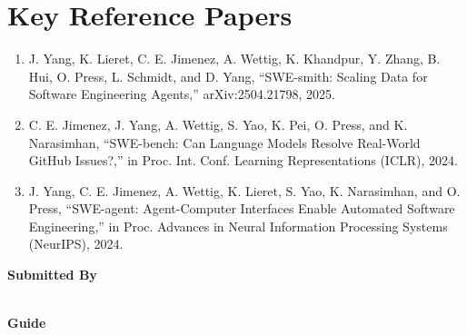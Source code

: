 \documentclass[11pt]{article}
\begin{document}
\section*{Key Reference Papers}
\begin{enumerate}
  \item J. Yang, K. Lieret, C. E. Jimenez, A. Wettig, K. Khandpur, Y. Zhang, B. Hui, O. Press, L. Schmidt, and D. Yang, ``SWE-smith: Scaling Data for Software Engineering Agents,'' arXiv:2504.21798, 2025.
  \item C. E. Jimenez, J. Yang, A. Wettig, S. Yao, K. Pei, O. Press, and K. Narasimhan, ``SWE-bench: Can Language Models Resolve Real-World GitHub Issues?,'' in Proc. Int. Conf. Learning Representations (ICLR), 2024.
  \item J. Yang, C. E. Jimenez, A. Wettig, K. Lieret, S. Yao, K. Narasimhan, and O. Press, ``SWE-agent: Agent-Computer Interfaces Enable Automated Software Engineering,'' in Proc. Advances in Neural Information Processing Systems (NeurIPS), 2024.
\end{enumerate}
\vspace{0.8em}
\noindent\textbf{Submitted By}\\
\seminarName\\
\seminarRoll

\vspace{0.6em}
\noindent\textbf{Guide}\\
\seminarGuide
\end{document}
